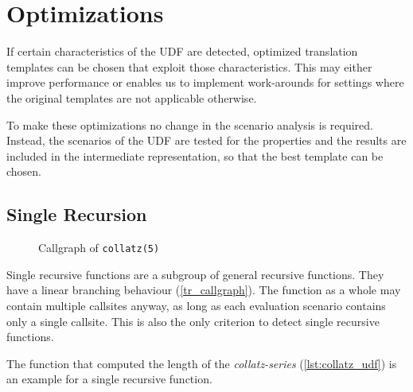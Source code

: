 \chapter{Optimizations}

If certain characteristics of the UDF are detected, optimized translation templates can be chosen that exploit those characteristics. This may either improve performance or enables us to implement work-arounds for settings where the original templates are not applicable otherwise.

To make these optimizations no change in the scenario analysis is required. Instead, the scenarios of the UDF are tested for the properties and the results are included in the intermediate representation, so that the best template can be chosen.

\section{Single Recursion}

\begin{wrapfigure}{r}{0.2\textwidth}
  \vspace{-10pt}
  \centering
{}
  \vspace{-10pt}
  \caption{Callgraph of \texttt{collatz(5)}}
  \label{tr_callgraph}
\end{wrapfigure}

Single recursive functions are a subgroup of general recursive functions. They have a linear branching behaviour (\autoref{tr_callgraph}). The function as a whole may contain multiple callsites anyway, as long as each evaluation scenario contains only a single callsite. This is also the only criterion to detect single recursive functions.

The function that computed the length of the \textit{collatz-series} (\autoref{lst:collatz_udf}) is an example for a single recursive function.


